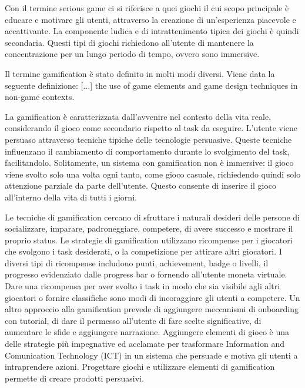 

Con il termine serious game ci si riferisce a quei giochi il cui scopo principale è educare e motivare gli utenti, attraverso la creazione di un'esperienza piacevole e accattivante. La componente ludica e di intrattenimento tipica dei giochi è quindi secondaria.
Questi tipi di giochi richiedono all'utente di mantenere la concentrazione per un lungo periodo di tempo, ovvero sono immersive.

Il termine gamification è stato definito in molti modi diversi. Viene data la seguente definizione:
[...] the use of game elements and game design techniques in non-game contexts.

La gamification è caratterizzata dall'avvenire nel contesto della vita reale, considerando il gioco come secondario rispetto al task da eseguire. L'utente viene persuaso attraverso tecniche tipiche delle tecnologie persuasive. Queste tecniche influenzano il cambiamento di comportamento durante lo svolgimento del task, facilitandolo.
Solitamente, un sistema con gamification non è immersive: il gioco viene svolto solo una volta ogni tanto, come gioco casuale, richiedendo quindi solo attenzione parziale da parte dell'utente. Questo consente di inserire il gioco all'interno della vita di tutti i giorni.

Le tecniche di gamification cercano di sfruttare i naturali desideri delle persone di socializzare, imparare, padroneggiare, competere, di avere successo e mostrare il proprio status. Le strategie di gamification utilizzano ricompense per i giocatori che svolgono i task desiderati, o la competizione per attirare altri giocatori. I diversi tipi di ricompense includono punti, achievement, badge o livelli, il progresso evidenziato dalle progress bar o fornendo all'utente moneta virtuale. Dare una ricompensa per aver svolto i task in modo che sia visibile agli altri giocatori o fornire classifiche sono modi di incoraggiare gli utenti a competere. Un altro approccio alla gamification prevede di aggiungere meccanismi di onboarding con tutorial, di dare il permesso all'utente di fare scelte significative, di aumentare le sfide e aggiungere narrazione.
Aggiungere elementi di gioco è una delle strategie più impegnative ed acclamate per trasformare Information and Comunication Technology (ICT) in un sistema che persuade e motiva gli utenti a intraprendere azioni.
Progettare giochi e utilizzare elementi di gamification permette di creare prodotti persuasivi.

